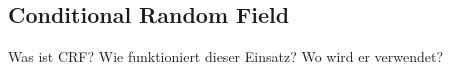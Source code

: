 \subsection{Conditional Random Field}
Was ist CRF? Wie funktioniert dieser Einsatz? Wo wird er verwendet?




